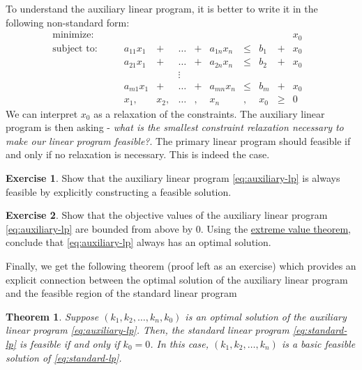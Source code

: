 \documentclass[
]{book}
\newtheorem{theorem}{Theorem}[chapter]
\theoremstyle{definition}
\theoremstyle{definition}
\theoremstyle{definition}
\newtheorem{exercise}{Exercise}[chapter]
\theoremstyle{definition}
\theoremstyle{remark}
\begin{document}
To understand the auxiliary linear program, it is better to write it in the following non-standard form:
\begin{equation*}
  \begin{array}{lrrrrrrrrrrrrr}
    \mbox{minimize: } & & & & & & & & & & & x_0 & \\
    \mbox{subject to: } 
      & & & a_{11} x_1 & + & \dots & + & a_{1n} x_n & \leq & b_1 & + & x_0 \\
      & & & a_{21} x_1 & + & \dots & + & a_{2n} x_n & \leq & b_2 & + & x_0 \\
      & & & & & \vdots &  \\
      & & & a_{m1} x_1 & + & \dots & + & a_{mn} x_n & \leq & b_m & + & x_0 \\
      & & & x_1, & x_2, & \dots &, & x_n & , & x_0 & \geq & 0
  \end{array} 
\end{equation*}
We can interpret \(x_0\) as a relaxation of the constraints. The auxiliary linear program is then asking - \emph{what is the smallest constraint relaxation necessary to make our linear program feasible?}. The primary linear program should feasible if and only if no relaxation is necessary. This is indeed the case.

\begin{exercise}
Show that the auxiliary linear program \eqref{eq:auxiliary-lp} is always feasible by explicitly constructing a feasible solution.
\end{exercise}

\begin{exercise}
Show that the objective values of the auxiliary linear program \eqref{eq:auxiliary-lp} are bounded from above by 0. Using the \href{https://en.wikipedia.org/wiki/Extreme_value_theorem}{extreme value theorem}, conclude that \eqref{eq:auxiliary-lp} always has an optimal solution.
\end{exercise}

Finally, we get the following theorem (proof left as an exercise) which provides an explicit connection between the optimal solution of the auxiliary linear program and the feasible region of the standard linear program

\begin{theorem}
\protect\hypertarget{thm:auxiliary-lp}{}\label{thm:auxiliary-lp}Suppose \((k_1, k_2, \dots, k_n, k_0)\) is an optimal solution of the auxiliary linear program \eqref{eq:auxiliary-lp}. Then, the standard linear program \eqref{eq:standard-lp} is feasible if and only if \(k_0 = 0\). In this case, \((k_1, k_2, \dots, k_n)\) is a basic feasible solution of \eqref{eq:standard-lp}.
\end{theorem}
\end{document}
